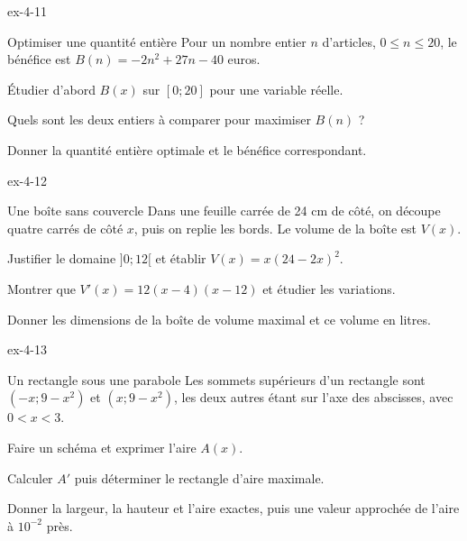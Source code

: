 \begin{blocLivre}{ex-4-11}
\begin{exercice}[2]{Optimiser une quantité entière}
Pour un nombre entier $n$ d'articles, $0\leq n\leq20$, le bénéfice est
$B(n)=-2n^2+27n-40$ euros.
\begin{questions}\item Étudier d'abord $B(x)$ sur $[0;20]$ pour une variable réelle.
\item Quels sont les deux entiers à comparer pour maximiser $B(n)$ ?
\item Donner la quantité entière optimale et le bénéfice correspondant.
\end{questions}
\end{exercice}
\end{blocLivre}
\clearpage
{}
\begin{blocLivre}{ex-4-12}
\begin{exercice}[3]{Une boîte sans couvercle}
Dans une feuille carrée de 24 cm de côté, on découpe quatre carrés de côté $x$,
puis on replie les bords. Le volume de la boîte est $V(x)$.
\begin{center}\par{}\end{center}
\begin{questions}\item Justifier le domaine $]0;12[$ et établir $V(x)=x(24-2x)^2$.
\item Montrer que $V'(x)=12(x-4)(x-12)$ et étudier les variations.
\item Donner les dimensions de la boîte de volume maximal et ce volume en litres.
\end{questions}
\end{exercice}
\end{blocLivre}
\begin{blocLivre}{ex-4-13}
\begin{exercice}[3]{Un rectangle sous une parabole}
Les sommets supérieurs d'un rectangle sont $(-x;9-x^2)$ et $(x;9-x^2)$,
les deux autres étant sur l'axe des abscisses, avec $0<x<3$.
\begin{questions}\item Faire un schéma et exprimer l'aire $A(x)$.
\item Calculer $A'$ puis déterminer le rectangle d'aire maximale.
\item Donner la largeur, la hauteur et l'aire exactes, puis une valeur approchée de l'aire à $10^{-2}$ près.
\end{questions}
\label{figlivre-r04-13-rectangle-ex}

\end{exercice}
\end{blocLivre}
